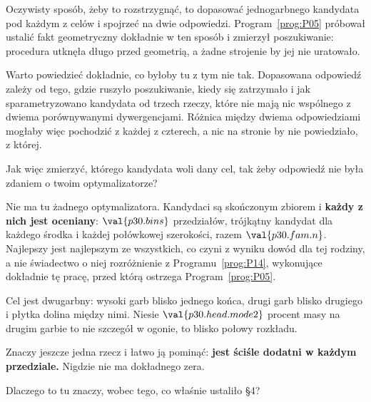 \begin{fr}
Oczywisty sposób, żeby to rozstrzygnąć, to dopasować jednogarbnego kandydata
pod każdym z celów i spojrzeć na dwie odpowiedzi. Program~\ref{prog:P05}
próbował ustalić fakt geometryczny dokładnie w ten sposób i zmierzył
poszukiwanie: procedura utknęła długo przed geometrią, a żadne strojenie by
jej nie uratowało.

Warto powiedzieć dokładnie, co byłoby tu z tym nie tak. Dopasowana odpowiedź
zależy od tego, gdzie ruszyło poszukiwanie, kiedy się zatrzymało i jak
sparametryzowano kandydata \dash{} od trzech rzeczy, które nie mają nic
wspólnego z dwiema porównywanymi dywergencjami. Różnica między dwiema
odpowiedziami mogłaby więc pochodzić z każdej z czterech, a nic na stronie by
nie powiedziało, z której.

Jak więc zmierzyć, którego kandydata woli dany cel, tak żeby odpowiedź nie
była zdaniem o twoim optymalizatorze?
\dotline
\nextframe
\end{fr}

\begin{fr}

Nie ma tu żadnego optymalizatora. Kandydaci są skończonym zbiorem i
\textbf{każdy z nich jest oceniany}: $\val{p30.bins}$ przedziałów, trójkątny
kandydat dla każdego środka i każdej połówkowej szerokości, razem
$\val{p30.fam.n}$. Najlepszy jest najlepszym ze wszystkich, co czyni z
wyniku dowód dla tej rodziny, a nie świadectwo o niej \dash{} rozróżnienie z
Programu~\ref{prog:P14}, wykonujące dokładnie tę pracę, przed którą
ostrzega Program~\ref{prog:P05}.
\end{fr}

\begin{fr}
Cel jest dwugarbny: wysoki garb blisko jednego końca, drugi garb blisko
drugiego i płytka dolina między nimi. Niesie $\val{p30.head.mode2}$ procent
masy na drugim garbie \dash{} to nie szczegół w ogonie, to blisko połowy
rozkładu.

Znaczy jeszcze jedna rzecz i łatwo ją pominąć: \textbf{jest ściśle dodatni w
każdym przedziale.} Nigdzie nie ma dokładnego zera.

Dlaczego to tu znaczy, wobec tego, co właśnie ustaliło §4?
\dotline
\nextframe
\end{fr}

